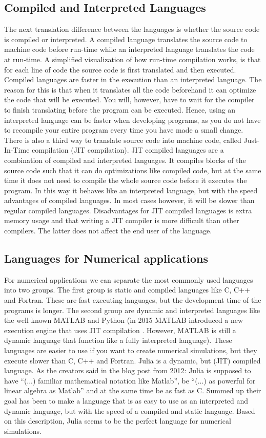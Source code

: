 \subsection{Compiled and Interpreted Languages}
The next translation difference between the languages is whether the source code is compiled or interpreted. A compiled language translates the source code to machine code before run-time while an interpreted language translates the code at run-time. A simplified visualization of how run-time compilation works, is that for each line of code the source code is first translated and then executed. Compiled languages are faster in the execution than an interpreted language. The reason for this is that when it translates all the code beforehand it can optimize the code that will be executed. You will, however, have to wait for the compiler to finish translating before the program can be executed. Hence, using an interpreted language can be faster when developing programs, as you do not have to recompile your entire program every time you have made a small change. There is also a third way to translate source code into machine code, called Just-In-Time compilation (JIT compilation). JIT compiled languages are a combination of compiled and interpreted languages. It compiles blocks of the source code such that it can do optimizations like compiled code, but at the same time it does not need to compile the whole source code before it executes the program. In this way it behaves like an interpreted language, but with the speed advantages of compiled languages. In most cases however, it will be slower than regular compiled languages. Disadvantages for JIT compiled languages is extra memory usage and that writing a JIT compiler is more difficult than other compilers. The latter does not affect the end user of the language.

\subsection{Languages for Numerical applications}
\label{sec:numericalLang}
For numerical applications we can separate the most commonly used languages into two groups. The first group is static and compiled languages like C, C++ and Fortran. These are fast executing languages, but the development time of the programs is longer. The second group are dynamic and interpreted languages like the well known MATLAB and Python (in 2015 MATLAB introduced a new execution engine that uses JIT compilation \emph{\citep{MatlabJIT}}. However, MATLAB is still a dynamic language that function like a fully interpreted language). These languages are easier to use if you want to create numerical simulations, but they execute slower than C, C++ and Fortran. Julia is a dynamic, but (JIT) compiled language. As the creators said in the blog post from 2012: Julia is supposed to have \enquote{(...) familiar mathematical notation like Matlab}, be \enquote{(...) as  powerful  for  linear  algebra  as Matlab} and at the same time be as fast as C. Summed up their goal has been to make a language that is as easy to use as an interpreted and dynamic language, but with the speed of a compiled and static language. Based on this description, Julia seems to be the perfect language for numerical simulations.

